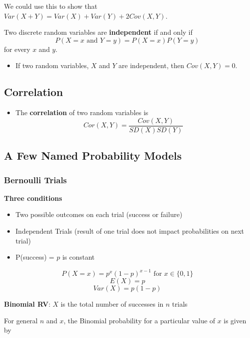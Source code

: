 \documentclass[
]{book}
\providecommand{\tightlist}{%
  \setlength{\itemsep}{0pt}\setlength{\parskip}{0pt}}
\begin{document}
We could use this to show that \(Var(X+Y) = Var(X)+ Var(Y) + 2Cov(X,Y)\).

Two discrete random variables are \textbf{independent} if and only if
\[P(X = x\text{ and } Y = y)  = P(X=x)P(Y=y)\]
for every \(x\) and \(y\).

\begin{itemize}
\tightlist
\item
  If two random variables, \(X\) and \(Y\) are independent, then \(Cov(X,Y)= 0\).
\end{itemize}

\subsection{Correlation}\label{correlation}

\begin{itemize}
\tightlist
\item
  The \textbf{correlation} of two random variables is
  \[Cor(X,Y) =\frac{Cov(X,Y)}{SD(X)SD(Y)}\]
\end{itemize}

\subsection{A Few Named Probability Models}\label{a-few-named-probability-models}

\subsubsection{Bernoulli Trials}\label{bernoulli-trials}

\textbf{Three conditions}

\begin{itemize}
\tightlist
\item
  Two possible outcomes on each trial (success or failure)
\item
  Independent Trials (result of one trial does not impact probabilities on next trial)
\item
  P(success) = \(p\) is constant
\end{itemize}

\[P(X = x) = p^x (1-p)^{x-1} \text{ for } x\in\{0,1\}\]
\[E(X) = p\]
\[Var(X) = p(1-p) \]

\textbf{Binomial RV}: \(X\) is the total number of successes in \(n\) trials

For general \(n\) and \(x\), the Binomial probability for a particular value of \(x\) is given by
\end{document}
